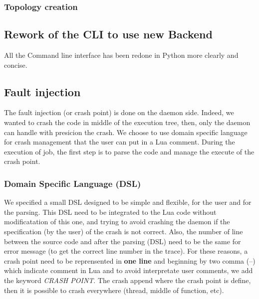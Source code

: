 \documentclass{eplmastersthesis}
\begin{document}
        \subsubsection{Topology creation}

      \subsection{Rework of the CLI to use new Backend}

        All the Command line interface has been redone in Python more clearly and concise.

      \subsection{Fault injection}
        The fault injection (or crash point) is done on the daemon side. Indeed, we wanted 
        to crash the code in middle of the execution tree, then, only the daemon can 
        handle with presicion the crash. We choose to use domain specific language for 
        crash management that the user can put in a Lua comment. During the execution of job, the first step 
        is to parse the code and manage the execute of the crash point.

        \subsubsection{Domain Specific Language (DSL)}
        
        We specified a small DSL designed to be simple and flexible, for the user and for the parsing. This DSL need to 
        be integrated to the Lua code without modificatation of this one, and trying to avoid crashing the 
        daemon if the specification (by the user) of the crash is not correct. Also, the number of line between the 
        source code and after the parsing (DSL) need to be the same for error message (to get the correct line number in the trace).
        For these reasons, a crash point need to be reprensented in \textbf{one line} and beginning by two comma (--) which 
        indicate comment in Lua and to avoid interpretate user comments, we add the keyword \textit{CRASH POINT}. 
        The crash append where the crash point is define, then it is possible to 
        crash everywhere (thread, middle of function, etc). \\
\end{document}
